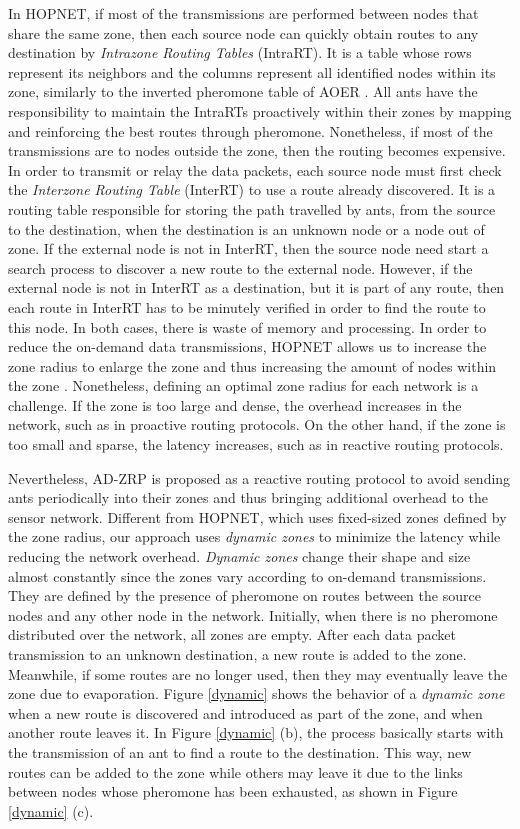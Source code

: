 \documentclass[conference]{IEEEtran}
\begin{document}
In HOPNET, if most of the transmissions are performed between nodes that share the same zone, then each source node can quickly obtain routes to any destination by \emph{Intrazone Routing Tables} (IntraRT).
It is a table whose rows represent its neighbors and the columns represent all identified nodes within its zone, similarly to the inverted pheromone table of AOER \cite{Shuang:2009}.
All ants have the responsibility to maintain the IntraRTs proactively within their zones by mapping and reinforcing the best routes through pheromone.
Nonetheless, if most of the transmissions are to nodes outside the zone, then the routing becomes expensive.
In order to transmit or relay the data packets, each source node must first check the \emph{Interzone Routing Table} (InterRT) to use a route already discovered.
It is a routing table responsible for storing the path travelled by ants, from the source to the destination, when the destination is an unknown node or a node out of zone.
If the external node is not in InterRT, then the source node need start a search process to discover a new route to the external node.
However, if the external node is not in InterRT as a destination, but it is part of any route, then each route in InterRT has to be minutely verified in order to find the route to this node.
In both cases, there is waste of memory and processing.
In order to reduce the on-demand data transmissions, HOPNET allows us to increase the zone radius to enlarge the zone and thus increasing the amount of nodes within the zone \cite{Wang:2009}.
Nonetheless, defining an optimal zone radius for each network is a challenge.
If the zone is too large and dense, the overhead increases in the network, such as in proactive routing protocols.
On the other hand, if the zone is too small and sparse, the latency increases, such as in reactive routing protocols.

Nevertheless, AD-ZRP is proposed as a reactive routing protocol to avoid sending ants periodically into their zones and thus bringing additional overhead to the sensor network.
Different from HOPNET, which uses fixed-sized zones defined by the zone radius, our approach uses \emph{dynamic zones} to minimize the latency while reducing the network overhead.
\emph{Dynamic zones} change their shape and size almost constantly since the zones vary according to on-demand transmissions.
They are defined by the presence of pheromone on routes between the source nodes and any other node in the network.
Initially, when there is no pheromone distributed over the network, all zones are empty.
After each data packet transmission to an unknown destination, a new route is added to the zone.
Meanwhile, if some routes are no longer used, then they may eventually leave the zone due to evaporation.
Figure \ref{dynamic} shows the behavior of a \emph{dynamic zone} when a new route is discovered and introduced as part of the zone, and when another route leaves it.
In Figure \ref{dynamic} (b), the process basically starts with the transmission of an ant to find a route to the destination.
This way, new routes can be added to the zone while others may leave it due to the links between nodes whose pheromone has been exhausted, as shown in Figure \ref{dynamic} (c).
\end{document}
